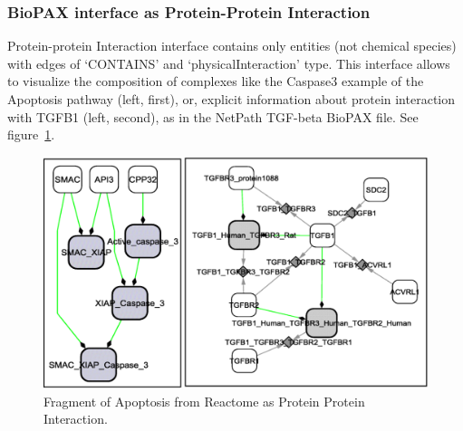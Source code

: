\subsubsection{BioPAX interface as Protein-Protein Interaction}
Protein-protein Interaction interface contains only entities (not chemical species) with edges of ‘CONTAINS’ and ‘physicalInteraction’ type. This interface allows to visualize the composition of complexes like the Caspase3 example of the Apoptosis pathway (left, first), or, explicit information about protein interaction with TGFB1 (left, second), as in the NetPath TGF-beta BioPAX file.  See figure~\ref{BioPAX_protein_protein_interaction}.
\begin{figure}
\centering
\includegraphics[width=19 cm]{graphics/BioPAX_protein_protein_interaction}
\caption{Fragment of Apoptosis from Reactome as Protein Protein Interaction.}
\label{BioPAX_protein_protein_interaction}
\end{figure}


